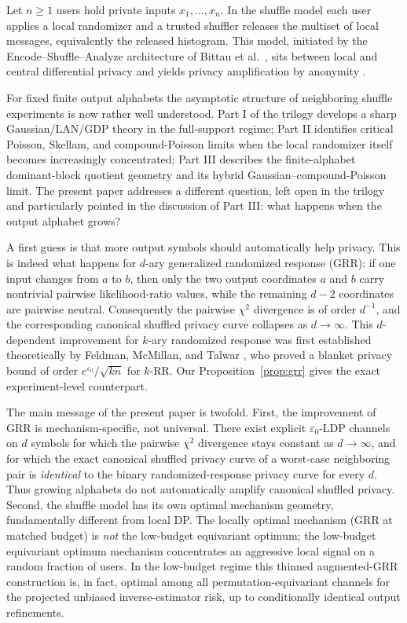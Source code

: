 \documentclass[11pt]{amsart}
\numberwithin{equation}{section}
\theoremstyle{definition}
\begin{document}
Let $n \ge 1$ users hold private inputs $x_1,\dots,x_n$.  In the shuffle model each user applies a local
randomizer and a trusted shuffler releases the multiset of local messages, equivalently the released histogram.
This model, initiated by the Encode--Shuffle--Analyze architecture of Bittau et al.\ \cite{BittauEtAl2017},
sits between local and central differential privacy and yields privacy amplification by anonymity
\cite{CheuEtAl2019,ErlingssonEtAl2019,BalleEtAl2019,FeldmanMcMillanTalwar2021,FeldmanMcMillanTalwar2023,TakagiLiew2026}.

For fixed finite output alphabets the asymptotic structure of neighboring shuffle experiments is now rather
well understood.  Part I of the trilogy \cite{ShvetsPartI} develops a sharp Gaussian/LAN/GDP theory in the
full-support regime; Part II \cite{ShvetsPartII} identifies critical Poisson, Skellam, and compound-Poisson
limits when the local randomizer itself becomes increasingly concentrated; Part III \cite{ShvetsPartIII}
describes the finite-alphabet dominant-block quotient geometry and its hybrid Gaussian--compound-Poisson
limit.  The present paper addresses a different question, left open in the trilogy and particularly pointed in
the discussion of Part III: what happens when the output alphabet grows?

A first guess is that more output symbols should automatically help privacy.  This is indeed what happens
for $d$-ary generalized randomized response (GRR): if one input changes from $a$ to $b$, then only the
two output coordinates $a$ and $b$ carry nontrivial pairwise likelihood-ratio values, while the remaining
$d-2$ coordinates are pairwise neutral.  Consequently the pairwise $\chi^2$ divergence is of order $d^{-1}$,
and the corresponding canonical shuffled privacy curve collapses as $d \to \infty$.
This $d$-dependent improvement for $k$-ary randomized response was first established theoretically by
Feldman, McMillan, and Talwar \cite[Corollary~4.2]{FeldmanMcMillanTalwar2021},
who proved a blanket privacy bound of order $e^{\varepsilon_0}/\!\sqrt{kn}$ for $k$-RR.
Our Proposition~\ref{prop:grr} gives the exact experiment-level counterpart.

The main message of the present paper is twofold.  First, the improvement of GRR is mechanism-specific, not universal.  There exist explicit
$\varepsilon_0$-LDP channels on $d$ symbols for which the pairwise $\chi^2$ divergence stays constant as
$d \to \infty$, and for which the exact canonical shuffled privacy curve of a worst-case neighboring pair is
\emph{identical} to the binary randomized-response privacy curve for every $d$.
Thus growing alphabets do not automatically amplify canonical shuffled privacy.
Second, the shuffle model has its own optimal mechanism geometry, fundamentally different from local DP.
The locally optimal mechanism (GRR at matched budget) is \emph{not} the low-budget equivariant optimum; the
low-budget equivariant optimum
mechanism concentrates an aggressive local signal on a random fraction of users.
In the low-budget regime this thinned augmented-GRR construction is, in fact, optimal among all
permutation-equivariant channels for the projected unbiased inverse-estimator risk, up to conditionally identical output refinements.
\end{document}
